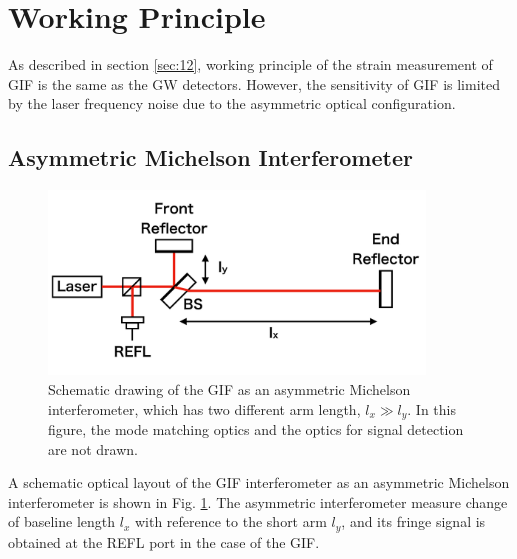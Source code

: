 \section{Working Principle} \label{sec:sec42}
As described in section \cref{sec:12}, working principle of the strain measurement of GIF is the same as the GW detectors. However, the sensitivity of GIF is limited by the laser frequency noise due to the asymmetric optical configuration.
\subsection{Asymmetric Michelson Interferometer}
\begin{figure}[h]
  \centering
  \includegraphics[width=10.0cm]{./img_chap4/img401.png}
  \caption{Schematic drawing of the GIF as an asymmetric Michelson interferometer, which has two different arm length, $l_x\gg{l_y}$. In this figure, the mode matching optics and the optics for signal detection are not drawn.} \label{img:img401}
\end{figure}
A schematic optical layout of the GIF interferometer as an asymmetric Michelson interferometer is shown in Fig. \ref{img:img401}. The asymmetric interferometer measure change of baseline length $l_x$ with reference to the short arm $l_y$, and its fringe signal is obtained at the REFL port in the case of the GIF.

